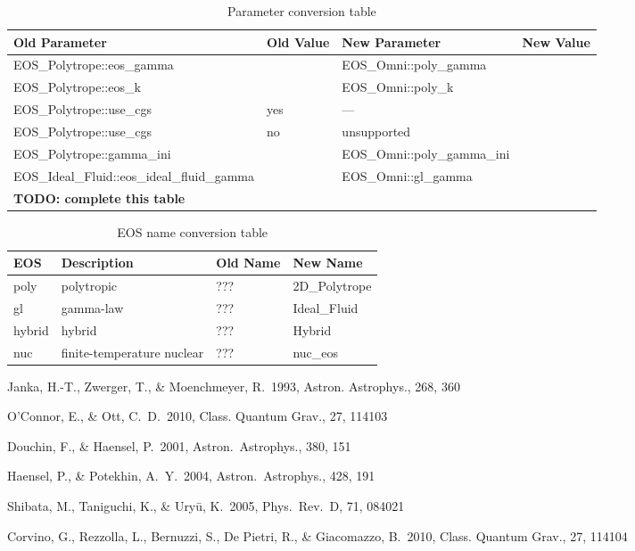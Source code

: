 \begin{table}[h]
  \begin{tabular}{ll|ll}
    Old Parameter & Old Value & New Parameter & New Value\\
    \hline
    EOS\_Polytrope::eos\_gamma & &
    EOS\_Omni::poly\_gamma &
    \\
    EOS\_Polytrope::eos\_k & &
    EOS\_Omni::poly\_k &
    \\
    EOS\_Polytrope::use\_cgs & yes &
    --- &
    \\
    EOS\_Polytrope::use\_cgs & no &
    unsupported &
    \\
    EOS\_Polytrope::gamma\_ini & &
    EOS\_Omni::poly\_gamma\_ini &
    \\
    EOS\_Ideal\_Fluid::eos\_ideal\_fluid\_gamma & &
    EOS\_Omni::gl\_gamma &
    \\
    \textbf{TODO: complete this table}
  \end{tabular}
  \caption{Parameter conversion table}
  \label{tab:paramconv}
\end{table}

\begin{table}[h]
  \begin{tabular}{llll}
    EOS    & Description                & Old Name & New Name \\\hline
    poly   & polytropic                 & ???      & 2D\_Polytrope \\
    gl     & gamma-law                  & ???      & Ideal\_Fluid \\
    hybrid & hybrid                     & ???      & Hybrid \\
    nuc    & finite-temperature nuclear & ???      & nuc\_eos
  \end{tabular}
  \caption{EOS name conversion table}
  \label{tab:eosnames}
\end{table}



\begin{thebibliography}{9}
 Janka, H.-T., Zwerger, T., \& Moenchmeyer, R.\ 1993, Astron. Astrophys., 268, 360 

 O'Connor, E., \& Ott, C.~D.\ 2010, Class. Quantum Grav., 27, 114103 

 Douchin, F., \& Haensel, P.\ 2001, Astron.~Astrophys., 380, 151 

 Haensel, P., \& Potekhin, A.~Y.\ 2004, Astron.~Astrophys., 428, 191 

 Shibata, M., Taniguchi, K., \& Ury{\= u}, K.\ 2005, Phys.~Rev.~D, 71, 084021 

 Corvino, G., Rezzolla, L., Bernuzzi, S., De Pietri, R., 
\& Giacomazzo, B.\ 2010, Class. Quantum Grav., 27, 114104 













\end{thebibliography}



